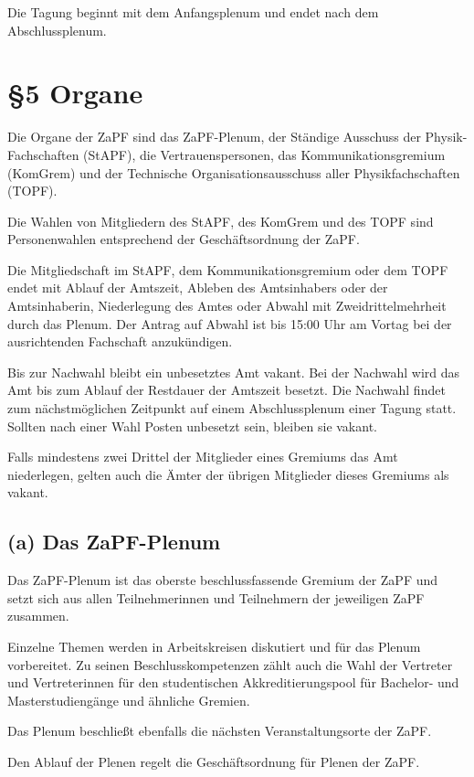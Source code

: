 \documentclass[12pt,oneside]{scrartcl}
\begin{document}
Die Tagung beginnt mit dem Anfangsplenum und endet nach dem Abschlussplenum.


\section{§5 Organe%
  \label{organe}%
}

Die Organe der ZaPF sind das ZaPF-Plenum, der Ständige Ausschuss der
Physik-Fachschaften (StAPF), die Vertrauenspersonen, das Kommunikationsgremium
(KomGrem) und der Technische Organisationsausschuss aller Physikfachschaften
(TOPF).

Die Wahlen von Mitgliedern des StAPF, des KomGrem und des TOPF sind
Personenwahlen entsprechend der Geschäftsordnung der ZaPF.

Die Mitgliedschaft im StAPF, dem Kommunikationsgremium oder dem TOPF endet mit
Ablauf der Amtszeit, Ableben des Amtsinhabers oder der Amtsinhaberin,
Niederlegung des Amtes oder Abwahl mit Zweidrittelmehrheit durch das Plenum. Der
Antrag auf Abwahl ist bis 15:00 Uhr am Vortag bei der ausrichtenden Fachschaft
anzukündigen.

Bis zur Nachwahl bleibt ein unbesetztes Amt vakant. Bei der Nachwahl wird das
Amt bis zum Ablauf der Restdauer der Amtszeit besetzt.
Die Nachwahl findet zum nächstmöglichen Zeitpunkt auf einem Abschlussplenum
einer Tagung statt.
Sollten nach einer Wahl Posten unbesetzt sein, bleiben sie vakant.

Falls mindestens zwei Drittel der Mitglieder eines Gremiums das Amt niederlegen,
gelten auch die Ämter der übrigen Mitglieder dieses Gremiums als vakant.


\subsection{(a) Das ZaPF-Plenum%
  \label{a-das-zapf-plenum}%
}

Das ZaPF-Plenum ist das oberste beschlussfassende Gremium der ZaPF und setzt
sich aus allen Teilnehmerinnen und Teilnehmern der jeweiligen ZaPF zusammen.

Einzelne Themen werden in Arbeitskreisen diskutiert und für das Plenum vorbereitet.
Zu seinen Beschlusskompetenzen zählt auch die Wahl der Vertreter und Vertreterinnen
für den studentischen Akkreditierungspool für Bachelor- und Masterstudiengänge und
ähnliche Gremien.

Das Plenum beschließt ebenfalls die nächsten Veranstaltungsorte der ZaPF.

Den Ablauf der Plenen regelt die Geschäftsordnung für Plenen der ZaPF.
\end{document}
